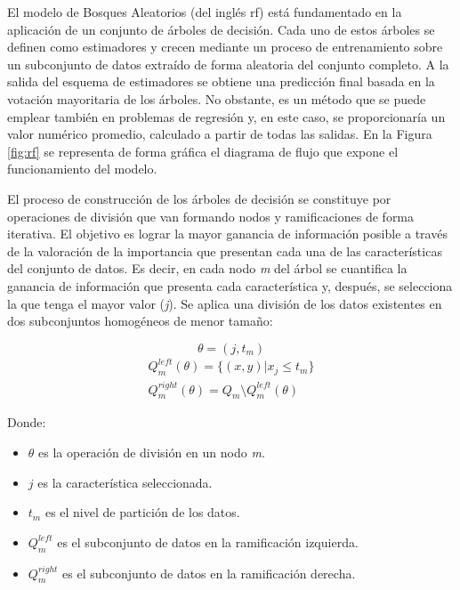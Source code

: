 El modelo de Bosques Aleatorios (del inglés \gls{rf}) está fundamentado en la aplicación de un conjunto de árboles de decisión. Cada uno de estos árboles se definen como estimadores y crecen mediante un proceso de entrenamiento sobre un subconjunto de datos extraído de forma aleatoria del conjunto completo. A la salida del esquema de estimadores se obtiene una predicción final basada en la votación mayoritaria de los árboles. No obstante, es un método que se puede emplear también en problemas de regresión y, en este caso, se proporcionaría un valor numérico promedio, calculado a partir de todas las salidas. En la Figura \ref{fig:rf} se representa de forma gráfica el diagrama de flujo que expone el funcionamiento del modelo. \cite{rfmedium}

\vspace{3mm}

El proceso de construcción de los árboles de decisión se constituye por operaciones de división que van formando nodos y ramificaciones de forma iterativa. El objetivo es lograr la mayor ganancia de información posible a través de la valoración de la importancia que presentan cada una de las características del conjunto de datos. Es decir, en cada nodo \textit{m} del árbol se cuantifica la ganancia de información que presenta cada característica y, después, se selecciona la que tenga el mayor valor (\textit{j}). Se aplica una división de los datos existentes en dos subconjuntos homogéneos de menor tamaño: \cite{rfmedium2}

\[\theta = (j, t_m)\]
\[\begin{array}{ll}
    Q_m^{left}(\theta) = \{(x, y) | x_j \leq t_m\}\\
    Q_m^{right}(\theta) = Q_m \setminus Q_m^{left}(\theta)
\end{array}\]

Donde:
\begin{itemize}
    \renewcommand{\labelitemi}{}
    \item \( \theta \) es la operación de división en un nodo \textit{m}.
    \item \( j\) es la característica seleccionada.
    \item \( t_m\) es el nivel de partición de los datos.
    \item \( Q_m^{left}\) es el subconjunto de datos en la ramificación izquierda.
    \item \( Q_m^{right}\) es el subconjunto de datos en la ramificación derecha.
\end{itemize}

